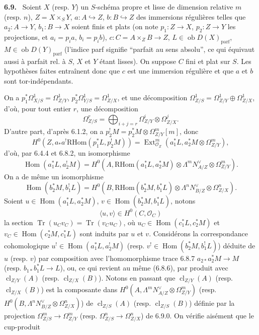 \documentclass[11pt]{article}
\newenvironment{statement}[1]{\par\medskip\noindent\textbf{#1.}\ }{\par\medskip}
\DeclareMathOperator{\Hom}{Hom}
\DeclareMathOperator{\Ext}{Ext}
\newcommand{\ob}{\operatorname{ob}}
\providecommand{\RHom}{\mathrm{RHom}}
\providecommand{\cl}{\operatorname{cl}}
\providecommand{\Tr}{\operatorname{Tr}}
\providecommand{\parf}{\mathrm{parf}}
\providecommand{\OO}{\mathcal O}
\begin{document}
\begin{statement}{6.9}
Soient $X$ (resp. $Y$) un $S$-schéma propre et lisse de dimension relative $m$ (resp. $n$), $Z=X\times_SY$, $a:A\hookrightarrow Z$, $b:B\hookrightarrow Z$ des immersions régulières telles que $a_2:A\to Y$, $b_1:B\to X$ soient finis et plats (on note $p_1:Z\to X$, $p_2:Z\to Y$ les projections, et $a_i=p_ia$, $b_i=p_ib$), $c:C=A\times_ZB\to Z$, $L\in\ob D(X)_{\parf}$, $M\in\ob D(Y)_{\parf}$ (l'indice parf signifie ``parfait au sens absolu'', ce qui équivaut aussi à parfait rel. à $S$, $X$ et $Y$ étant lisses). On suppose $C$ fini et plat sur $S$. Les hypothèses faites entraînent donc que $c$ est une immersion régulière et que $a$ et $b$ sont tor-indépendants.

On a $p_1^*\Omega^1_{X/S}=\Omega^1_{Z/Y}$, $p_2^*\Omega^1_{Y/S}=\Omega^1_{Z/X}$, et une décomposition $\Omega^1_{Z/S}=\Omega^1_{Z/Y}\oplus\Omega^1_{Z/X}$, d'où, pour tout entier $r$, une décomposition
\begin{equation}
\tag{6.9.0}
\Omega^r_{Z/S}=\bigoplus_{i+j=r}\Omega^i_{Z/Y}\otimes\Omega^j_{Z/X}.
\end{equation}
D'autre part, d'après 6.1.2, on a $p_2^!M=p_2^*M\otimes\Omega^m_{Z/Y}[m]$, donc
\[
H^0(Z,a_*a^!\RHom(p_1^*L,p_2^!M))=
\Ext^m_{\OO_Z}(a_1^*L,a_2^*M\otimes\Omega^m_{Z/Y}),
\]
d'où, par 6.4.4 et 6.8.2, un isomorphisme
\begin{equation}
\tag{6.9.1}
\Hom(a_1^*L,a_2^!M)=H^0(A,\RHom(a_1^*L,a_2^*M)\otimes\Lambda^mN^\vee_{A/Z}\otimes\Omega^m_{Z/Y}).
\end{equation}
On a de même un isomorphisme
\begin{equation}
\tag{6.9.2}
\Hom(b_2^*M,b_1^!L)=H^0(B,\RHom(b_2^*M,b_1^*L)\otimes\Lambda^nN^\vee_{B/Z}\otimes\Omega^n_{Z/X}).
\end{equation}
Soient $u\in\Hom(a_1^*L,a_2^*M)$, $v\in\Hom(b_2^*M,b_1^*L)$, notons
\begin{equation}
\tag{6.9.3}
\langle u,v\rangle\in H^0(C,\OO_C)
\end{equation}
la section $\Tr(u_Cv_C)=\Tr(v_Cu_C)$, où $u_C\in\Hom(c_1^*L,c_2^*M)$ et $v_C\in\Hom(c_2^*M,c_1^*L)$ sont induits par $u$ et $v$. Considérons la correspondance cohomologique $u^!\in\Hom(a_1^*L,a_2^!M)$ (resp. $v^!\in\Hom(b_2^*M,b_1^!L)$) déduite de $u$ (resp. $v$) par composition avec l'homomorphisme trace 6.8.7 $a_{2*}a_2^*M\to M$ (resp. $b_{1*}b_1^*L\to L$), ou, ce qui revient au même (6.8.6), par produit avec $\cl_{Z/Y}(A)$ (resp. $\cl_{Z/X}(B)$). Notons en passant que $\cl_{Z/Y}(A)$ (resp. $\cl_{Z/X}(B)$) est la composante dans $H^0(A,\Lambda^mN^\vee_{A/Z}\otimes\Omega^m_{Z/Y})$ (resp. $H^0(B,\Lambda^nN^\vee_{B/Z}\otimes\Omega^n_{Z/X})$) de $\cl_{Z/S}(A)$ (resp. $\cl_{Z/S}(B)$) définie par la projection $\Omega^m_{Z/S}\to\Omega^m_{Z/Y}$ (resp. $\Omega^n_{Z/S}\to\Omega^n_{Z/X}$) de 6.9.0. On vérifie aisément que le cup-produit

\end{statement}
\end{document}
